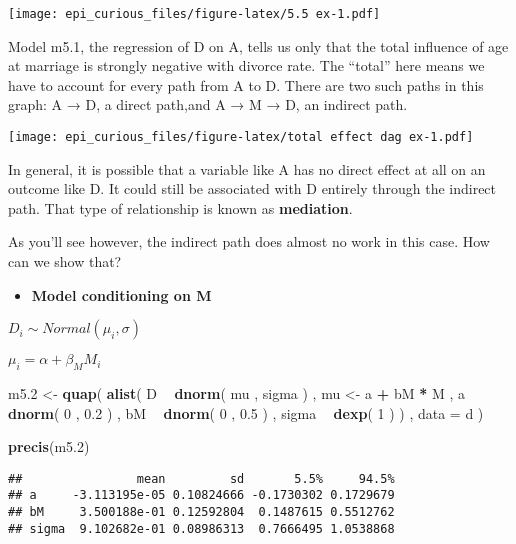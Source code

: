 \documentclass[
]{article}
\newenvironment{Shaded}{\begin{snugshade}}{\end{snugshade}}
\newcommand{\DataTypeTok}[1]{\textcolor[rgb]{0.13,0.29,0.53}{#1}}
\newcommand{\DecValTok}[1]{\textcolor[rgb]{0.00,0.00,0.81}{#1}}
\newcommand{\FloatTok}[1]{\textcolor[rgb]{0.00,0.00,0.81}{#1}}
\newcommand{\KeywordTok}[1]{\textcolor[rgb]{0.13,0.29,0.53}{\textbf{#1}}}
\newcommand{\NormalTok}[1]{#1}
\newcommand{\OperatorTok}[1]{\textcolor[rgb]{0.81,0.36,0.00}{\textbf{#1}}}
\newcommand{\StringTok}[1]{\textcolor[rgb]{0.31,0.60,0.02}{#1}}
\providecommand{\tightlist}{%
  \setlength{\itemsep}{0pt}\setlength{\parskip}{0pt}}
\begin{document}
\texttt{[image: epi\_curious\_files/figure-latex/5.5 ex-1.pdf]}

Model m5.1, the regression of D on A, tells us only that the total
influence of age at marriage is strongly negative with divorce rate. The
``total'' here means we have to account for every path from A to D.
There are two such paths in this graph: A → D, a direct path,and A → M →
D, an indirect path.

\texttt{[image: epi\_curious\_files/figure-latex/total effect dag ex-1.pdf]}

In general, it is possible that a variable like A has no direct effect
at all on an outcome like D. It could still be associated with D
entirely through the indirect path. That type of relationship is known
as \textbf{mediation}.

As you'll see however, the indirect path does almost no work in this
case. How can we show that?

\begin{itemize}
\tightlist
\item
  \textbf{Model conditioning on M}
\end{itemize}

\(D_{i} ∼ Normal(\mu_{i}, \sigma)\)

\(\mu_{i} = \alpha + \beta_{M}M_{i}\)

\begin{Shaded}
\begin{Highlighting}[]
\NormalTok{m5}\FloatTok{.2}\NormalTok{ <-}\StringTok{ }\KeywordTok{quap}\NormalTok{(}
    \KeywordTok{alist}\NormalTok{(}
\NormalTok{        D }\OperatorTok{~}\StringTok{ }\KeywordTok{dnorm}\NormalTok{( mu , sigma ) ,}
\NormalTok{        mu <-}\StringTok{ }\NormalTok{a }\OperatorTok{+}\StringTok{ }\NormalTok{bM }\OperatorTok{*}\StringTok{ }\NormalTok{M ,}
\NormalTok{        a }\OperatorTok{~}\StringTok{ }\KeywordTok{dnorm}\NormalTok{( }\DecValTok{0}\NormalTok{ , }\FloatTok{0.2}\NormalTok{ ) ,}
\NormalTok{        bM }\OperatorTok{~}\StringTok{ }\KeywordTok{dnorm}\NormalTok{( }\DecValTok{0}\NormalTok{ , }\FloatTok{0.5}\NormalTok{ ) ,}
\NormalTok{        sigma }\OperatorTok{~}\StringTok{ }\KeywordTok{dexp}\NormalTok{( }\DecValTok{1}\NormalTok{ )}
\NormalTok{) , }\DataTypeTok{data =}\NormalTok{ d )}

\KeywordTok{precis}\NormalTok{(m5}\FloatTok{.2}\NormalTok{)}
\end{Highlighting}
\end{Shaded}

\begin{verbatim}
##                mean         sd       5.5%     94.5%
## a     -3.113195e-05 0.10824666 -0.1730302 0.1729679
## bM     3.500188e-01 0.12592804  0.1487615 0.5512762
## sigma  9.102682e-01 0.08986313  0.7666495 1.0538868
\end{verbatim}
\end{document}
